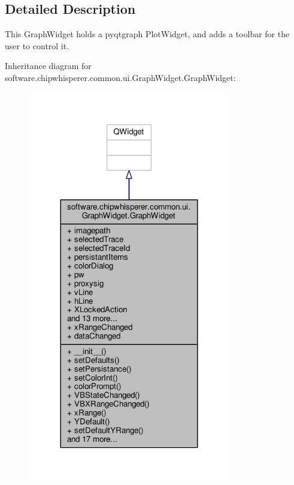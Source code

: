 \subsection{Detailed Description}
\begin{DoxyVerb}This GraphWidget holds a pyqtgraph PlotWidget, and adds a toolbar for the user to control it.
\end{DoxyVerb}
 

Inheritance diagram for software.\+chipwhisperer.\+common.\+ui.\+Graph\+Widget.\+Graph\+Widget\+:\nopagebreak
\begin{figure}[H]
\begin{center}
\leavevmode
\includegraphics[width=251pt]{d4/d67/classsoftware_1_1chipwhisperer_1_1common_1_1ui_1_1GraphWidget_1_1GraphWidget__inherit__graph}
\end{center}
\end{figure}


